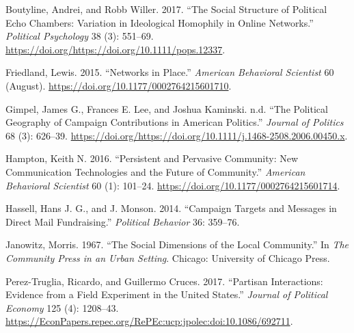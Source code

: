 \documentclass[12pt,]{article}
\begin{document}
\leavevmode\hypertarget{ref-boutyline2017}{}%
Boutyline, Andrei, and Robb Willer. 2017. ``The Social Structure of
Political Echo Chambers: Variation in Ideological Homophily in Online
Networks.'' \emph{Political Psychology} 38 (3): 551--69.
\url{https://doi.org/https://doi.org/10.1111/pops.12337}.

\leavevmode\hypertarget{ref-friedland2015}{}%
Friedland, Lewis. 2015. ``Networks in Place.'' \emph{American Behavioral
Scientist} 60 (August). \url{https://doi.org/10.1177/0002764215601710}.

\leavevmode\hypertarget{ref-gimpel2006}{}%
Gimpel, James G., Frances E. Lee, and Joshua Kaminski. n.d. ``The
Political Geography of Campaign Contributions in American Politics.''
\emph{Journal of Politics} 68 (3): 626--39.
\url{https://doi.org/https://doi.org/10.1111/j.1468-2508.2006.00450.x}.

\leavevmode\hypertarget{ref-hampton2015}{}%
Hampton, Keith N. 2016. ``Persistent and Pervasive Community: New
Communication Technologies and the Future of Community.'' \emph{American
Behavioral Scientist} 60 (1): 101--24.
\url{https://doi.org/10.1177/0002764215601714}.

\leavevmode\hypertarget{ref-hassell2014}{}%
Hassell, Hans J. G., and J. Monson. 2014. ``Campaign Targets and
Messages in Direct Mail Fundraising.'' \emph{Political Behavior} 36:
359--76.

\leavevmode\hypertarget{ref-janowitz1967}{}%
Janowitz, Morris. 1967. ``The Social Dimensions of the Local
Community.'' In \emph{The Community Press in an Urban Setting}. Chicago:
University of Chicago Press.

\leavevmode\hypertarget{ref-perez2017}{}%
Perez-Truglia, Ricardo, and Guillermo Cruces. 2017. ``Partisan
Interactions: Evidence from a Field Experiment in the United States.''
\emph{Journal of Political Economy} 125 (4): 1208--43.
\url{https://EconPapers.repec.org/RePEc:ucp:jpolec:doi:10.1086/692711}.





\newpage
\singlespacing 
\end{document}
